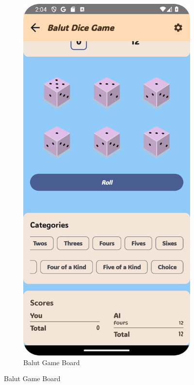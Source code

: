 \begin{figure}[h]
\begin{subfigure}[b]{0.27\textwidth}
        \includegraphics[width=\textwidth]{img/balut board.png}
        \caption{Balut Game Board}
    \end{subfigure}

\end{figure}
